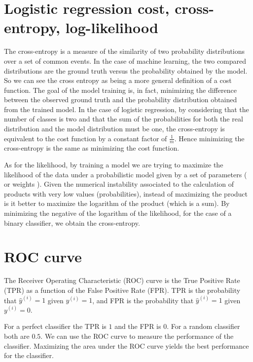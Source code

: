 \documentclass[a4paper]{article}
\begin{document}

\section{Logistic regression cost, cross-entropy, log-likelihood}
The cross-entropy is a measure of the similarity of two probability distributions over a set of common events. In the case of machine learning, the two compared distributions are the ground truth versus the probability obtained by the model. So we can see the cross entropy as being a more general definition of a cost function. The goal of the model training is, in fact, minimizing the difference between the observed ground truth and the probability distribution obtained from the trained model. In the case of logistic regression, by considering that the number of classes is two and that the sum of the probabilities for both the real distribution and the model distribution must be one, the cross-entropy is equivalent to the cost function by a constant factor of $\frac{1}{m}$. Hence minimizing the cross-entropy is the same as minimizing the cost function.

As for the likelihood, by training a model we are trying to maximize the likelihood of the data under a probabilistic model given by a set of parameters ( or weights ). Given the numerical instability associated to the calculation of products with very low values (probabilities), instead of maximizing the product is it better to maximize the logarithm of the product (which is a sum). By minimizing the negative of the logarithm of the likelihood, for the case of a binary classifier, we obtain the cross-entropy.

\section{ROC curve}
The Receiver Operating Characteristic (ROC) curve is the True Positive Rate (TPR) as a function of the False Positive Rate (FPR). TPR is the probability that $\hat{y}^{(i)}=1$ given $y^{(i)}=1$, and FPR is the probability that $\hat{y}^{(i)}=1$ given $y^{(i)}=0$.

For a perfect classifier the TPR is $1$ and the FPR is $0$. For a random classifier both are $0.5$. We can use the ROC curve to measure the performance of the classifier. Maximizing the area under the ROC curve yields the best performance for the classifier.
\end{document}
